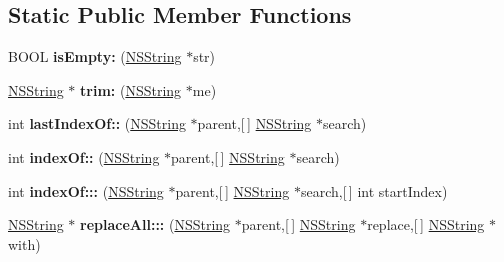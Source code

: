 \subsection*{\-Static \-Public \-Member \-Functions}
\begin{DoxyCompactItemize}
\item 
\hypertarget{interface_string_util_a40083507052fd562a1a256bbd3744d1f}{
\-B\-O\-O\-L {\bfseries is\-Empty\-:} (\hyperlink{class_n_s_string}{\-N\-S\-String} $\ast$str)}
\label{interface_string_util_a40083507052fd562a1a256bbd3744d1f}

\item 
\hypertarget{interface_string_util_add1b89265fef6ea0863897267096657c}{
\hyperlink{class_n_s_string}{\-N\-S\-String} $\ast$ {\bfseries trim\-:} (\hyperlink{class_n_s_string}{\-N\-S\-String} $\ast$me)}
\label{interface_string_util_add1b89265fef6ea0863897267096657c}

\item 
\hypertarget{interface_string_util_a49957101b9646c548bae488c065d91af}{
int {\bfseries last\-Index\-Of\-::} (\hyperlink{class_n_s_string}{\-N\-S\-String} $\ast$parent,\mbox{[}$\,$\mbox{]} \hyperlink{class_n_s_string}{\-N\-S\-String} $\ast$search)}
\label{interface_string_util_a49957101b9646c548bae488c065d91af}

\item 
\hypertarget{interface_string_util_a77634d6fd6126b5f3b2cb85412f3f004}{
int {\bfseries index\-Of\-::} (\hyperlink{class_n_s_string}{\-N\-S\-String} $\ast$parent,\mbox{[}$\,$\mbox{]} \hyperlink{class_n_s_string}{\-N\-S\-String} $\ast$search)}
\label{interface_string_util_a77634d6fd6126b5f3b2cb85412f3f004}

\item 
\hypertarget{interface_string_util_a27c8ab20cf07adc4d69e7c6e16ba7c85}{
int {\bfseries index\-Of\-:::} (\hyperlink{class_n_s_string}{\-N\-S\-String} $\ast$parent,\mbox{[}$\,$\mbox{]} \hyperlink{class_n_s_string}{\-N\-S\-String} $\ast$search,\mbox{[}$\,$\mbox{]} int start\-Index)}
\label{interface_string_util_a27c8ab20cf07adc4d69e7c6e16ba7c85}

\item 
\hypertarget{interface_string_util_ad64882b6b8f2cab34d303cf781fca08b}{
\hyperlink{class_n_s_string}{\-N\-S\-String} $\ast$ {\bfseries replace\-All\-:::} (\hyperlink{class_n_s_string}{\-N\-S\-String} $\ast$parent,\mbox{[}$\,$\mbox{]} \hyperlink{class_n_s_string}{\-N\-S\-String} $\ast$replace,\mbox{[}$\,$\mbox{]} \hyperlink{class_n_s_string}{\-N\-S\-String} $\ast$with)}
\label{interface_string_util_ad64882b6b8f2cab34d303cf781fca08b}


\end{DoxyCompactItemize}
